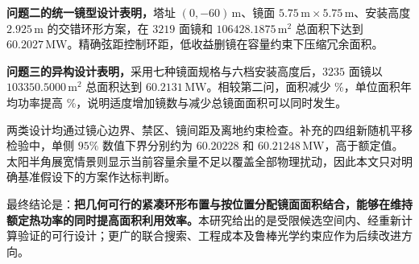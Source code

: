 \textbf{问题二的统一镜型设计表明，}塔址 $(0,-60)\,\mathrm m$、镜面 $5.75\,\mathrm m\times5.75\,\mathrm m$、安装高度 $2.925\,\mathrm m$ 的交错环形方案，在 $3219$ 面镜和 $106428.1875\,\mathrm m^2$ 总面积下达到 $60.2027\,\mathrm{MW}$。精确弦距控制环距，低收益删镜在容量约束下压缩冗余面积。

\textbf{问题三的异构设计表明，}采用七种镜面规格与六档安装高度后，$3235$ 面镜以 $103350.5000\,\mathrm m^2$ 总面积达到 $60.2131\,\mathrm{MW}$。相较第二问，面积减少 \Saving\%，单位面积年均功率提高 \Gain\%，说明适度增加镜数与减少总镜面面积可以同时发生。

两类设计均通过镜心边界、禁区、镜间距及离地约束检查。补充的四组新随机平移检验中，单侧 $95\%$ 数值下界分别约为 $60.20228$ 和 $60.21248\,\mathrm{MW}$，高于额定值。太阳半角展宽情景则显示当前容量余量不足以覆盖全部物理扰动，因此本文只对明确基准假设下的方案作达标判断。

最终结论是：\textbf{把几何可行的紧凑环形布置与按位置分配镜面面积结合，能够在维持额定热功率的同时提高面积利用效率。}本研究给出的是受限候选空间内、经重新计算验证的可行设计；更广的联合搜索、工程成本及鲁棒光学约束应作为后续改进方向。
